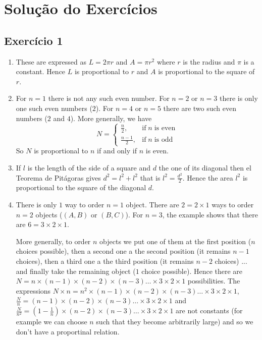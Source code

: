 \section{Solução do Exercícios}

\subsection*{Exercício 1}

\begin{enumerate}
\item These are expressed as $L = 2 \pi r$ and $A = \pi r^2$ where $r$ is
  the radius and $\pi$ is a constant. Hence $L$ is proportional to $r$ and
  $A$ is proportional to the square of $r$.
\item For $n=1$ there is not any such even number.
  For $n=2$ or $n=3$ there is only one such even numbers ($2$).
  For $n=4$ or $n=5$ there are two such even numbers ($2$ and $4$).
  More generally, we have
  $$N=\begin{cases} \frac{n}{2}, & \text{if}\;n\;\text{is even} \\ \frac{n-1}{2}, & \text{if}\;n\;\text{is odd} \end{cases}$$
  So $N$ is proportional to $n$ if and only if $n$ is even.
\item If $l$ is the length of the side of a square and $d$ the one of its
  diagonal then el Teorema de Pitágoras gives
  $d^2 = l^2 + l^2$ that is $l^2 = \frac{d^2}{2}$. Hence the area $l^2$ is
  proportional to the square of the diagonal $d$.
  
\item There is only $1$ way to order $n=1$ object.
  There are $2 = 2 \times 1$ ways to order $n = 2$ objects ($(A,B)$ or $(B,C)$).
  For $n=3$, the example shows that there are $6 = 3 \times 2 \times 1$.

  More generally, to order $n$ objects we put one of them at the first position
  ($n$ choices possible), then a second one a the second position
  (it remains $n-1$ choices), then a third one a the third position
  (it remains $n-2$ choices) ... and finally take the remaining object
  ($1$ choice possible).
  Hence there are $N = n \times {(n-1)} \times {(n-2)} \times {(n-3)}
  \dots \times 3 \times 2 \times 1$ possibilities.
  The expressions
  $N \times n = n^2 \times {(n-1)} \times {(n-2)} \times {(n-3)}
  \dots \times 3 \times 2 \times 1$,
  $\frac{N}{n} = {(n-1)} \times {(n-2)} \times {(n-3)}
  \dots \times 3 \times 2 \times 1$ and
  $\frac{N}{n^2} = {(1-\frac{1}{n})} \times {(n-2)} \times {(n-3)}
  \dots \times 3 \times 2 \times 1$ are not constants (for example we
  can choose $n$ such that they become arbitrarily large) and so
  we don't have a proportinal relation.


\end{enumerate}
